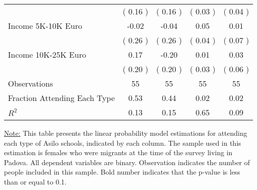 \begin{table}[H]
{\begin{tabular}{lcccc}
\quad  & (     0.16 ) & (     0.16 )  & (     0.03 )  & (     0.04 )  \\
\quad Income 5K-10K Euro &     -0.02 &     -0.04 &      0.05 &      0.01 \\
\quad  & (     0.26 ) & (     0.26 )  & (     0.04 )  & (     0.07 )  \\
\quad Income 10K-25K Euro &      0.17 &     -0.20 &      0.01 &      0.03 \\
\quad  & (     0.20 ) & (     0.20 )  & (     0.03 )  & (     0.06 )  \\
\midrule
Observations & 55 & 55 & 55 & 55 \\
Fraction Attending Each Type &      0.53 &      0.44 &      0.02 &      0.02 \\
\midrule
$ R^2$ &      0.13 &      0.15 &      0.65 &      0.09 \\
\bottomrule
\end{tabular}}
\end{table}
\begin{footnotesize}
\noindent\underline{Note:} This table presents the linear probability model estimations for attending each type of Asilo schools, indicated by each column. The sample used in this estimation is females who were migrants at the time of the survey living in Padova. All dependent variables are binary. Observation indicates the number of people included in this sample. Bold number indicates that the p-value is less than or equal to 0.1.
\end{footnotesize}
